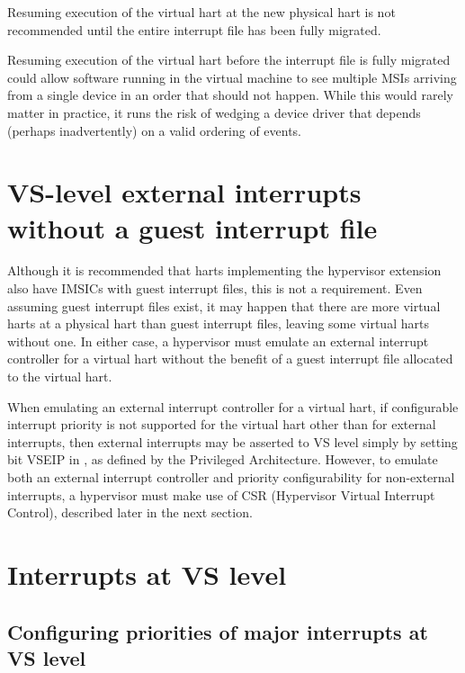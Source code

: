 Resuming execution of the virtual hart at the new physical hart is not
recommended until the entire interrupt file has been fully migrated.

\begin{commentary}
Resuming execution of the virtual hart before the interrupt file is
fully migrated could allow software running in the virtual machine to
see multiple MSIs arriving from a single device in an order that should
not happen.
While this would rarely matter in practice, it runs the risk of
wedging a device driver that depends (perhaps inadvertently) on a valid
ordering of events.
\end{commentary}

\section{VS-level external interrupts without a guest interrupt file}

Although it is recommended that harts implementing the hypervisor
extension also have IMSICs with guest interrupt files, this is not a
requirement.
Even assuming guest interrupt files exist, it may happen that there
are more virtual harts at a physical hart than guest interrupt files,
leaving some virtual harts without one.
In either case, a hypervisor must emulate an external interrupt
controller for a virtual hart without the benefit of a guest interrupt
file allocated to the virtual hart.

When emulating an external interrupt controller for a virtual hart,
if configurable interrupt priority is not supported for the virtual
hart other than for external interrupts, then external interrupts may
be asserted to VS level simply by setting bit VSEIP in , as
defined by the {\RISCV} Privileged Architecture.
However, to emulate both an external interrupt controller and priority
configurability for non-external interrupts, a hypervisor must make use
of CSR  (Hypervisor Virtual Interrupt Control), described
later in the next section.

\section{Interrupts at VS level}

\subsection{Configuring priorities of major interrupts at VS level}

